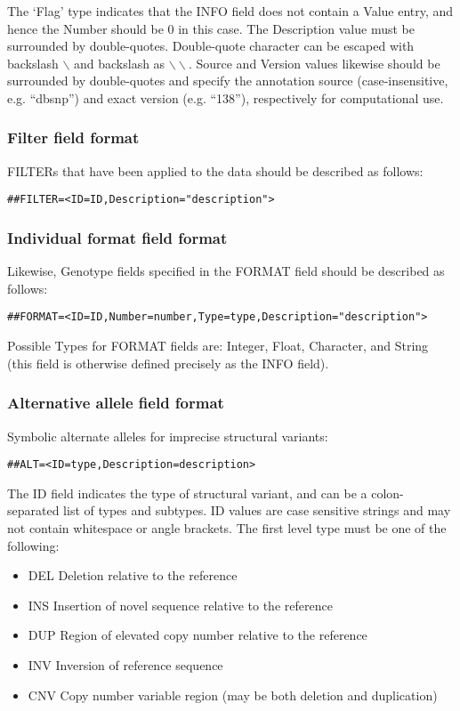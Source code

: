 \documentclass[8pt]{article}
\begin{document}
The `Flag' type indicates that the INFO field does not contain a Value entry, and hence the Number should be $0$ in this case. The Description value must be surrounded by double-quotes. Double-quote character can be escaped with backslash $\backslash$ and backslash as $\backslash\backslash$. Source and Version values likewise should be surrounded by double-quotes and specify the annotation source (case-insensitive, e.g. ``dbsnp'') and exact version (e.g. ``138''), respectively for computational use.

\subsubsection{Filter field format}
FILTERs that have been applied to the data should be described as follows:

\begin{verbatim}
##FILTER=<ID=ID,Description="description">
\end{verbatim}

\subsubsection{Individual format field format}
Likewise, Genotype fields specified in the FORMAT field should be described as follows:

\begin{verbatim}
##FORMAT=<ID=ID,Number=number,Type=type,Description="description">
\end{verbatim}

Possible Types for FORMAT fields are: Integer, Float, Character, and String (this field is otherwise defined precisely as the INFO field).

\subsubsection{Alternative allele field format}
Symbolic alternate alleles for imprecise structural variants:

\begin{verbatim}
##ALT=<ID=type,Description=description>
\end{verbatim}
The ID field indicates the type of structural variant, and can be a colon-separated list of types and subtypes. ID values are case sensitive strings and may not contain whitespace or angle brackets. The first level type must be one of the following:
\begin{itemize}
  \item DEL Deletion relative to the reference
  \item INS Insertion of novel sequence relative to the reference
  \item DUP Region of elevated copy number relative to the reference
  \item INV Inversion of reference sequence
  \item CNV Copy number variable region (may be both deletion and duplication)
\end{itemize}
\end{document}
